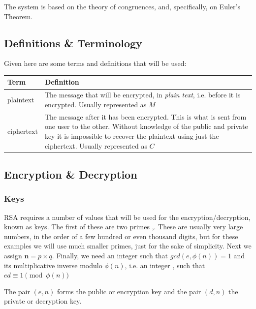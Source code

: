 \documentclass[12pt, titlepage]{article}
\begin{document}
The system is based on the theory of congruences, and, specifically, on Euler's Theorem.

    \subsection{Definitions \& Terminology}
    Given here are some terms and definitions that will be used:
    \begin{table}[H]
        \begin{tabular}{ | m{5em} | p{30em} | }
            \hline
            Term      & Definition\\
            \hline
            plaintext & The message that will be encrypted, in \emph{plain
                        text}, i.e. before it is encrypted. Usually represented as $M$\\
            \hline
            ciphertext & The message after it has been encrypted. This is what
                         is sent from one user to the other. Without
                         knowledge of the public and private key it is
                         impossible to recover the plaintext using just the
                         ciphertext. Usually represented as $C$\\
            \hline
        \end{tabular}
    \end{table}

    \subsection{Encryption \& Decryption}
        \subsubsection{Keys}
        RSA requires a number of values that will be used for the encryption/decryption,
        known as keys.  The first of these are two primes ,. These are
        usually very large numbers, in the order of a few hundred or even thousand digits,
        but for these examples we will use much smaller primes, just for the sake of
        simplicity. Next we assign $\pmb{n}=p \times q$.  Finally, we need an integer
         such that $gcd(e, \phi (n)) = 1$ and its multiplicative inverse modulo
        $\phi(n)$, i.e. an integer , such that $ed \equiv 1 \pmod{\phi(n)}$

        The pair $(e, n)$ forms the public or encryption key and the pair $(d, n)$ the private
        or decryption key.
\end{document}

